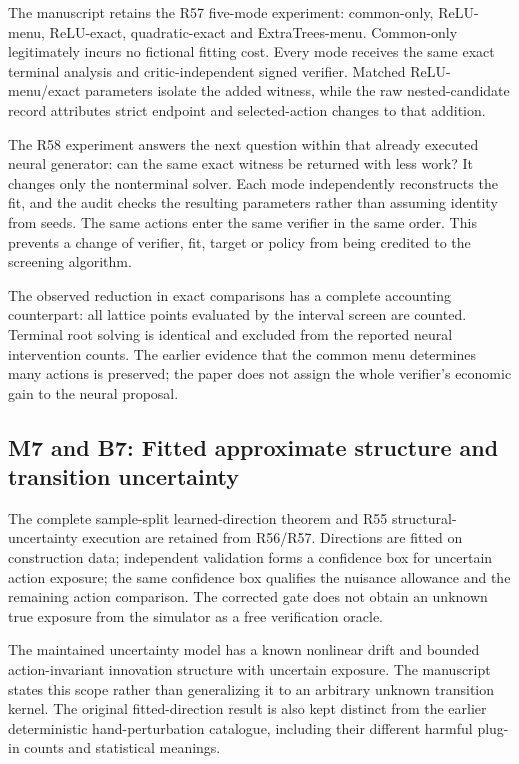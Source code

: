 \documentclass[ecta,nameyear,draft]{econsocart}
\begin{document}
The manuscript retains the R57 five-mode experiment: common-only,
ReLU-menu, ReLU-exact, quadratic-exact and ExtraTrees-menu. Common-only
legitimately incurs no fictional fitting cost. Every mode receives the
same exact terminal analysis and critic-independent signed verifier.
Matched ReLU-menu/exact parameters isolate the added witness, while the
raw nested-candidate record attributes strict endpoint and
selected-action changes to that addition.

The R58 experiment answers the next question within that already
executed neural generator: can the same exact witness be returned with
less work? It changes only the nonterminal solver. Each mode
independently reconstructs the fit, and the audit checks the resulting
parameters rather than assuming identity from seeds. The same actions
enter the same verifier in the same order. This prevents a change of
verifier, fit, target or policy from being credited to the screening
algorithm.

The observed reduction in exact comparisons has a complete accounting
counterpart: all lattice points evaluated by the interval screen are
counted. Terminal root solving is identical and excluded from the
reported neural intervention counts. The earlier evidence that the
common menu determines many actions is preserved; the paper does not
assign the whole verifier's economic gain to the neural proposal.

\hypertarget{m7-and-b7-fitted-approximate-structure-and-transition-uncertainty}{%
\subsection{M7 and B7: Fitted approximate structure and transition
uncertainty}\label{m7-and-b7-fitted-approximate-structure-and-transition-uncertainty}}

The complete sample-split learned-direction theorem and R55
structural-uncertainty execution are retained from R56/R57. Directions
are fitted on construction data; independent validation forms a
confidence box for uncertain action exposure; the same confidence box
qualifies the nuisance allowance and the remaining action comparison.
The corrected gate does not obtain an unknown true exposure from the
simulator as a free verification oracle.

The maintained uncertainty model has a known nonlinear drift and bounded
action-invariant innovation structure with uncertain exposure. The
manuscript states this scope rather than generalizing it to an arbitrary
unknown transition kernel. The original fitted-direction result is also
kept distinct from the earlier deterministic hand-perturbation
catalogue, including their different harmful plug-in counts and
statistical meanings.
\end{document}
